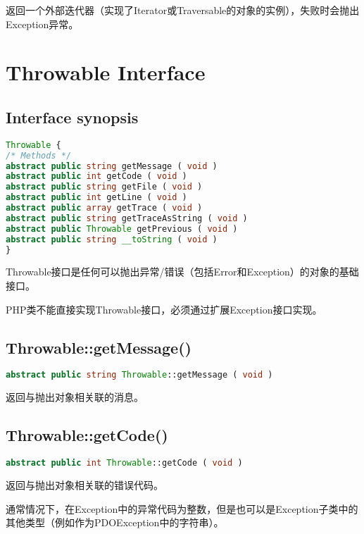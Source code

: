 返回一个外部迭代器（实现了Iterator或Traversable的对象的实例），失败时会抛出Exception异常。



\chapter{Throwable Interface}


\section{Interface synopsis}



\begin{lstlisting}[language=PHP]
Throwable {
/* Methods */
abstract public string getMessage ( void )
abstract public int getCode ( void )
abstract public string getFile ( void )
abstract public int getLine ( void )
abstract public array getTrace ( void )
abstract public string getTraceAsString ( void )
abstract public Throwable getPrevious ( void )
abstract public string __toString ( void )
}
\end{lstlisting}

Throwable接口是任何可以抛出异常/错误（包括Error和Exception）的对象的基础接口。

PHP类不能直接实现Throwable接口，必须通过扩展Exception接口实现。

\section{Throwable::getMessage()}

\begin{lstlisting}[language=PHP]
abstract public string Throwable::getMessage ( void )
\end{lstlisting}

返回与抛出对象相关联的消息。


\section{Throwable::getCode()}

\begin{lstlisting}[language=PHP]
abstract public int Throwable::getCode ( void )
\end{lstlisting}


返回与抛出对象相关联的错误代码。

通常情况下，在Exception中的异常代码为整数，但是也可以是Exception子类中的其他类型（例如作为PDOException中的字符串）。



